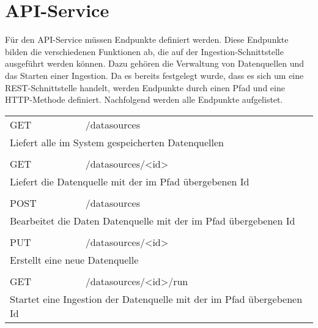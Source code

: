 \section{API-Service}

Für den API-Service müssen Endpunkte definiert werden.
Diese Endpunkte bilden die verschiedenen Funktionen ab, die auf der Ingestion-Schnittstelle ausgeführt werden können.
Dazu gehören die Verwaltung von Datenquellen und das Starten einer Ingestion.
Da es bereits festgelegt wurde, dass es sich um eine REST-Schnittstelle handelt, werden Endpunkte durch einen Pfad und eine HTTP-Methode definiert.
Nachfolgend werden alle Endpunkte aufgelistet.

\begin{table}[ht]
  \centering
  \begin{tabularx}{\linewidth}{lX}
    GET & /datasources \\
    \multicolumn{2}{l}{Liefert alle im System gespeicherten Datenquellen} \\
    \\
    GET & /datasources/\textless id\textgreater \\
    \multicolumn{2}{l}{Liefert die Datenquelle mit der im Pfad übergebenen Id} \\
    \\
    POST & /datasources \\
    \multicolumn{2}{l}{Bearbeitet die Daten Datenquelle mit der im Pfad übergebenen Id} \\
    \\
    PUT &  /datasources/\textless id\textgreater \\
    \multicolumn{2}{l}{Erstellt eine neue Datenquelle} \\
    \\
    GET &  /datasources/\textless id\textgreater/run \\
    \multicolumn{2}{l}{Startet eine Ingestion der Datenquelle mit der im Pfad übergebenen Id}
    
    
    

\end{tabularx}
\end{table}

